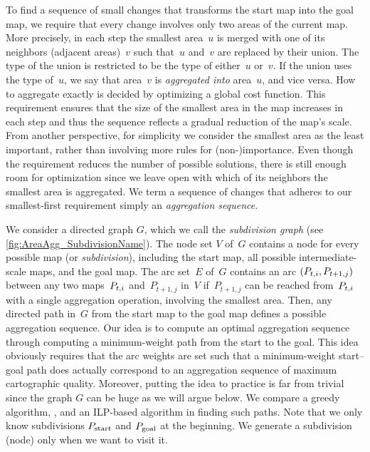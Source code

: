 To find a sequence of small changes 
that transforms the start map into the goal map,
we require that 
every change involves only two areas of the current map.
More precisely, in each step the smallest area~$u$ is merged 
with one of its neighbors (adjacent areas)~$v$
such that~$u$ and~$v$ are replaced by their union.
The type of the union is restricted to be 
the type of either~$u$ or~$v$.
If the union uses the type of~$u$, 
we say that area~$v$ is \emph{aggregated into} area~$u$, 
and vice versa. 
How to aggregate exactly is decided by 
optimizing a global cost function.
This requirement ensures that the 
size of the smallest area in the map increases in each step
and thus the sequence reflects a gradual reduction of the 
map's scale.
From another perspective, 
for simplicity we consider 
the smallest area as the least important, 
rather than involving more rules for (non-)importance. 
Even though the requirement reduces the number of possible 
solutions,
there is still enough room for optimization 
since we leave open with
which of its neighbors the smallest area is aggregated.
We term a sequence of changes 
that adheres to our smallest-first requirement simply 
an \emph{aggregation sequence}.


We consider a directed graph $G$, 
which we call the \emph{subdivision graph} 
(see \fig\ref{fig:AreaAgg_SubdivisionName}). 
The node set $V$ of~$G$ contains a node for every
possible map (or \emph{subdivision}), including the start map, all
possible intermediate-scale maps, and the goal map.
The arc set~$E$ of~$G$ contains an arc $(P_{t,i}, P_{t+1,j})$ 
between any two maps~$P_{t,i}$ and~$P_{t+1,j}$ in~$V$ 
if~$P_{t+1,j}$ can be reached from~$P_{t,i}$ 
with a single aggregation operation,
involving the smallest area.
Then, any directed path in~$G$ from the start map to the goal map
defines a possible aggregation sequence.
Our idea is to compute an optimal aggregation sequence through 
computing a minimum-weight path from the start to the goal.
This idea obviously requires that the arc weights are 
set such that a minimum-weight start--goal
path does actually correspond to an aggregation sequence of 
maximum cartographic quality.  
Moreover, putting the idea to practice is far from trivial 
since the graph $G$ can be huge as we will argue below.
We compare a greedy algorithm, \Astar, and an ILP-based algorithm
in finding such paths.
Note that we only know subdivisions 
$P_\mathrm{start}$ and $P_\mathrm{goal}$ at the beginning.
We generate a subdivision (node) only when we want to visit it.


